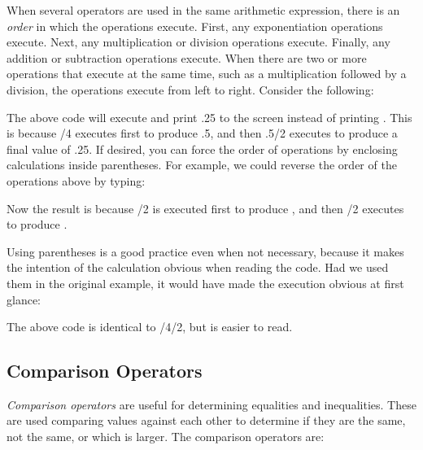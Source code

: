 When several operators are used in the same arithmetic expression, there is an
\emph{order} in which the operations execute.  First, any exponentiation
operations execute.  Next, any multiplication or division operations execute.
Finally, any addition or subtraction operations execute.  When there are two or
more operations that execute at the same time, such as a multiplication
followed by a division, the operations execute from left to right.  Consider
the following:\\


The above code will execute and print {\ttfamily .25} to the screen instead of
printing {}.  This is because {/4} executes first to
produce {\ttfamily .5}, and then {\ttfamily .5/2} executes to produce a final
value of {\ttfamily .25}.  If desired, you can force the order of operations by
enclosing calculations inside parentheses.  For example, we could reverse the
order of the operations above by typing:\\


Now the result is {} because {/2} is executed first to
produce {}, and then {/2} executes to produce {}.

Using parentheses is a good practice even when not necessary, because it makes
the intention of the calculation obvious when reading the code.  Had we used
them in the original example, it would have made the execution obvious at first
glance:\\


The above code is identical to {/4/2}, but is easier to read.

\subsection{Comparison Operators}

\emph{Comparison operators} are useful for determining equalities and
inequalities.  These are used comparing values against each other to determine
if they are the same, not the same, or which is larger.  The comparison
operators are:\\

